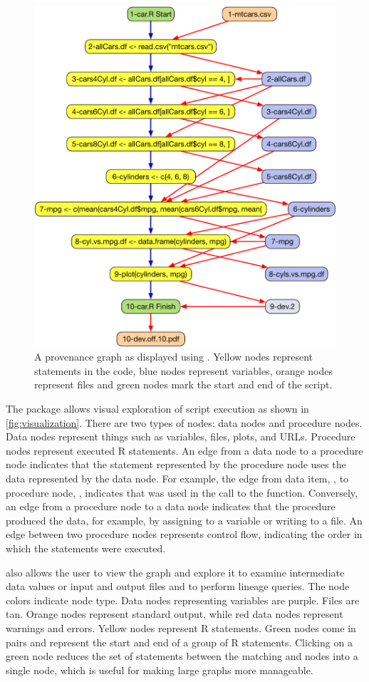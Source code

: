 \begin{figure}[p]
    \centering
    \includegraphics[width=.75\textwidth]{figures/car-graph.pdf}
    \caption{A provenance graph as displayed using .  Yellow nodes represent statements in the code, blue nodes represent variables, orange nodes represent files and green nodes mark the start and end of the script.}
    \label{fig:visualization}
\end{figure}

The  package allows visual exploration of script execution as shown in \autoref{fig:visualization}.  There are two types of nodes: data nodes and procedure nodes.  Data nodes represent things such as variables, files, plots, and URLs.  Procedure nodes represent executed R statements.  An edge from a data node to a procedure node indicates that the statement represented by the procedure node uses the data represented by the data node. For example, the edge from data item, , to procedure node, , indicates that  was used in the call to the  function.
Conversely, an edge from a procedure node to a data node indicates that the procedure produced the data, for example, by assigning to a variable or writing to a file.  An edge between two procedure nodes represents control flow, indicating the order in which the statements were executed.

 also allows the user to view the graph and explore it to examine intermediate data values or input and output files and to perform lineage queries.  The node colors indicate node type.  Data nodes representing variables are purple.  Files are tan.  Orange nodes represent standard output, while red data nodes represent warnings and errors.  Yellow nodes represent R statements.  Green nodes come in pairs and represent the start and end of a group of R statements. Clicking on a green node reduces the set of statements between the matching  and  nodes into a single node, which is useful for making large graphs more manageable.

